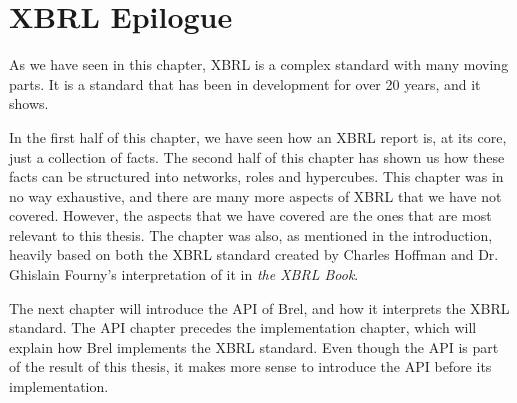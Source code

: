 \section{XBRL Epilogue}

As we have seen in this chapter, XBRL is a complex standard with many moving parts.
It is a standard that has been in development for over 20 years, and it shows.

In the first half of this chapter, we have seen how an XBRL report is, at its core, just a collection of facts.
The second half of this chapter has shown us how these facts can be structured into networks, roles and hypercubes.
This chapter was in no way exhaustive, and there are many more aspects of XBRL that we have not covered.
However, the aspects that we have covered are the ones that are most relevant to this thesis.
The chapter was also, as mentioned in the introduction, 
heavily based on both the XBRL standard\cite{xbrl} created by Charles Hoffman and 
Dr. Ghislain Fourny's interpretation of it in \textit{the XBRL Book}\cite{fourny2023xbrl}.

The next chapter will introduce the API of Brel, and how it interprets the XBRL standard.
The API chapter precedes the implementation chapter, which will explain how Brel implements the XBRL standard.
Even though the API is part of the result of this thesis, it makes more sense to introduce the API before its implementation.
